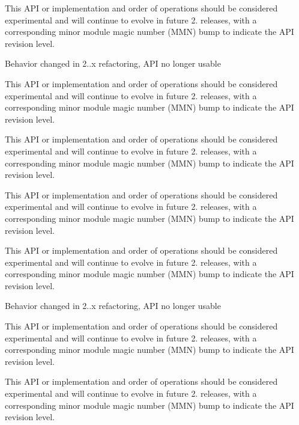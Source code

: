 \begin{DoxyRefList}
This A\+PI or implementation and order of operations should be considered experimental and will continue to evolve in future 2. releases, with a corresponding minor module magic number (M\+MN) bump to indicate the A\+PI revision level. 

Behavior changed in 2..\+x refactoring, A\+PI no longer usable  
\item[\label{bug__bug000003}%
\hypertarget{bug__bug000003}{}%
Global \hyperlink{group__APACHE__CORE__MUTEX_ga354bb6f9a53786fa1259e061ced592e2}{A\+P\+\_\+\+D\+E\+C\+L\+A\+RE} (apr\+\_\+status\+\_\+t) ap\+\_\+parse\+\_\+mutex(const char $\ast$arg]This A\+PI or implementation and order of operations should be considered experimental and will continue to evolve in future 2. releases, with a corresponding minor module magic number (M\+MN) bump to indicate the A\+PI revision level. 

This A\+PI or implementation and order of operations should be considered experimental and will continue to evolve in future 2. releases, with a corresponding minor module magic number (M\+MN) bump to indicate the A\+PI revision level. 

This A\+PI or implementation and order of operations should be considered experimental and will continue to evolve in future 2. releases, with a corresponding minor module magic number (M\+MN) bump to indicate the A\+PI revision level. 

This A\+PI or implementation and order of operations should be considered experimental and will continue to evolve in future 2. releases, with a corresponding minor module magic number (M\+MN) bump to indicate the A\+PI revision level. 

Behavior changed in 2..\+x refactoring, A\+PI no longer usable  
\item[\label{bug__bug000003}%
\hypertarget{bug__bug000003}{}%
Global \hyperlink{group__APACHE__CORE__MUTEX_ga354bb6f9a53786fa1259e061ced592e2}{A\+P\+\_\+\+D\+E\+C\+L\+A\+RE} (apr\+\_\+status\+\_\+t) ap\+\_\+parse\+\_\+mutex(const char $\ast$arg]This A\+PI or implementation and order of operations should be considered experimental and will continue to evolve in future 2. releases, with a corresponding minor module magic number (M\+MN) bump to indicate the A\+PI revision level. 

This A\+PI or implementation and order of operations should be considered experimental and will continue to evolve in future 2. releases, with a corresponding minor module magic number (M\+MN) bump to indicate the A\+PI revision level. 


\end{DoxyRefList}
